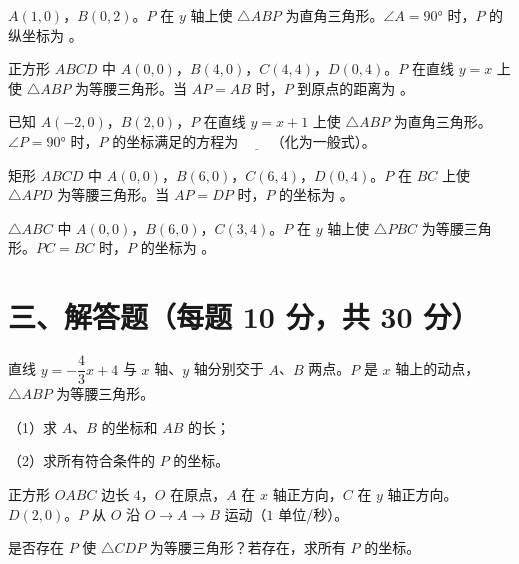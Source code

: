 \documentclass{exam-zh}
\newcommand{\answerarea}[1][40mm]{%
  \vspace{2mm}%
  \begin{tcolorbox}[
    enhanced, breakable,
    colback=white,
    colframe=white,
    boxrule=0pt,
    height=#1,
    valign=top,
    bottom=0mm,
    after skip=0mm,
  ]
  \end{tcolorbox}%
}
\begin{document}
\begin{question}[points=3]
  $A(1,0)$，$B(0,2)$。$P$ 在 $y$ 轴上使 $\triangle ABP$ 为直角三角形。$\angle A=90°$ 时，$P$ 的纵坐标为 \fillin。
  \fillin
\end{question}



\begin{question}[points=3]
  正方形 $ABCD$ 中 $A(0,0)$，$B(4,0)$，$C(4,4)$，$D(0,4)$。$P$ 在直线 $y=x$ 上使 $\triangle ABP$ 为等腰三角形。当 $AP=AB$ 时，$P$ 到原点的距离为 \fillin。
  \fillin
\end{question}



\begin{question}[points=3]
  已知 $A(-2,0)$，$B(2,0)$，$P$ 在直线 $y=x+1$ 上使 $\triangle ABP$ 为直角三角形。$\angle P=90°$ 时，$P$ 的坐标满足的方程为 $\underline{\quad\quad}$（化为一般式）。
  \fillin
\end{question}



\begin{question}[points=3]
  矩形 $ABCD$ 中 $A(0,0)$，$B(6,0)$，$C(6,4)$，$D(0,4)$。$P$ 在 $BC$ 上使 $\triangle APD$ 为等腰三角形。当 $AP=DP$ 时，$P$ 的坐标为 \fillin。
  \fillin
\end{question}



\begin{question}[points=3]
  $\triangle ABC$ 中 $A(0,0)$，$B(6,0)$，$C(3,4)$。$P$ 在 $y$ 轴上使 $\triangle PBC$ 为等腰三角形。$PC=BC$ 时，$P$ 的坐标为 \fillin。
  \fillin
\end{question}


\section*{三、解答题（每题 10 分，共 30 分）}


\begin{problem}[points=10]
  直线 $y=-\dfrac{4}{3}x+4$ 与 $x$ 轴、$y$ 轴分别交于 $A$、$B$ 两点。$P$ 是 $x$ 轴上的动点，$\triangle ABP$ 为等腰三角形。

（1）求 $A$、$B$ 的坐标和 $AB$ 的长；

（2）求所有符合条件的 $P$ 的坐标。
  \answerarea[80mm]
\end{problem}



\begin{problem}[points=10]
  正方形 $OABC$ 边长 $4$，$O$ 在原点，$A$ 在 $x$ 轴正方向，$C$ 在 $y$ 轴正方向。$D(2,0)$。$P$ 从 $O$ 沿 $O \to A \to B$ 运动（$1$ 单位/秒）。

是否存在 $P$ 使 $\triangle CDP$ 为等腰三角形？若存在，求所有 $P$ 的坐标。
  \answerarea[80mm]
\end{problem}
\end{document}
